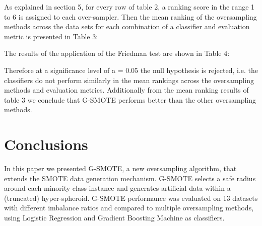 \documentclass[parskip=full]{scrartcl}
\begin{document}

As explained in section 5, for every row of table 2, a ranking score in the range 1 to 6 is assigned to each over-sampler. Then the mean ranking of the oversampling methods across the data sets for each combination of a classifier and evaluation metric is presented in Table 3:


The results of the application of the Friedman test are shown in Table 4:


Therefore at a significance level of a = 0.05 the null hypothesis is rejected, i.e. the classifiers do not perform similarly in the mean rankings across the oversampling methods and evaluation metrics. Additionally from the mean ranking results of table 3 we conclude that G-SMOTE performs better than the other oversampling methods.

\section{Conclusions}

In this paper we presented G-SMOTE, a new oversampling algorithm, that extends the SMOTE data generation mechanism. G-SMOTE selects a safe radius around each minority class instance and generates artificial data within a (truncated) hyper-spheroid. G-SMOTE performance was evaluated on 13 datasets with different imbalance ratios and compared to multiple oversampling methods, using Logistic Regression and Gradient Boosting Machine as classifiers. 
\end{document}

